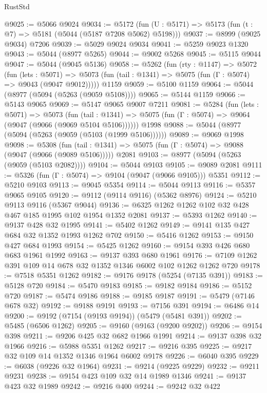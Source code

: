 \begin{lexlean}{RustStd}
\begin{coremodule}
@9025 := @5066 @9024
@9034 := @5172 (fun (U : @5171) => @5173 (fun (t : @7) => @5181 (@5044 (@5187 @7208 @5062) @5198)))
@9037 := @8999 (@9025 @9034) @7206
@9039 := @5029 @9024 @9034
@9041 := @5259 @9023 @1320
@9043 := @5044 (@8977 @5265)
@9044 := @9002 @5268
@9045 := @5115 @9044
@9047 := @5044 (@9045 @5136)
@9058 := @5262
    (fun (rty : @1147) =>
    @5072
      (fun (lets : @5071) =>
      @5073 (fun (tail : @1341) => @5075 (fun (Γ : @5074) => @9043 (@9047 @9012)))))
    @1159
@9059 := @5100 @1159
@9064 := @5044 (@8977 (@5094 (@5263 (@9059 @5108))))
@9065 := @5144 @1159
@9066 := @5143 @9065
@9069 := @5147 @9065 @9007 @7211
@9081 := @5284
    (fun (lets : @5071) =>
    @5073
      (fun (tail : @1341) => @5075 (fun (Γ : @5074) => @9064 (@9047 (@9066 (@9069 @5104 @5106))))))
    @1998
@9088 := @5044 (@8977 (@5094 (@5263 (@9059 (@5103 (@1999 @5106))))))
@9089 := @9069 @1998
@9098 := @5308
    (fun (tail : @1341) => @5075 (fun (Γ : @5074) => @9088 (@9047 (@9066 (@9089 @5106)))))
    @2081
@9103 := @8977 (@5094 (@5263 (@9059 (@5103 @2082))))
@9104 := @5044 @9103
@9105 := @9089 @2081
@9111 := @5326 (fun (Γ : @5074) => @9104 (@9047 (@9066 @9105))) @5351
@9112 := @5210 @9103
@9113 := @9045 @5354
@9114 := @5044 @9113
@9116 := @5357 @9065 @9105
@9120 := @9112 (@9114 @9116) (@5362 @8976)
@9124 := @5210 @9113 @9116 (@5367 @9044)
@9136 := @6325 @1262 @1262 @102 @32 @428 @467 @185 @1995 @102 @1954 @1352 @2081
@9137 := @5393 @1262
@9140 := @9137 @428 @32 @1995
@9141 := @5402 @1262
@9149 := @9141 @135 @427 @684 @32 @1352 @1993 @1262 @702
@9150 := @5416 @1262
@9153 := @9150 @427 @684 @1993
@9154 := @5425 @1262
@9160 := @9154 @393 @426 @680 @683 @1961 @1992
@9163 := @9137 @393 @680 @1961
@9176 := @7109 @1262 @391 @109 @14 @678 @32 @1352 @1346 @6002 @102 @1262 @1262 @720
@9178 := @7518 @5351 @1262
@9182 := @9176 @9178 (@5254 (@7135 @391))
@9183 := @5128 @720
@9184 := @5470 @9183
@9185 := @9182 @9184
@9186 := @5152 @720
@9187 := @5474 @9186
@9188 := @9185 @9187
@9191 := @5479 (@7146 @678 @32)
@9192 := @9188 @9191
@9193 := @7156 @391
@9194 := @6486 @14
@9200 := @9192 (@7154 (@9193 @9194)) (@5479 (@5481 @391))
@9202 := @5485 (@6506 @1262)
@9205 := @9160 (@9163 (@9200 @9202))
@9206 := @9154 @398
@9211 := @9206 @425 @32 @682 @1966 @1991
@9214 := @9137 @398 @32 @1966
@9216 := @5988 @5351 @1262
@9217 := @9216 @395
@9225 := @9217 @32 @109 @14 @1352 @1346 @1964 @6002 @9178
@9226 := @6040 @395
@9229 := @6038 (@9226 @32 @1964)
@9231 := @9214 (@9225 @9229)
@9232 := @9211 @9231
@9238 := @9154 @423 @109 @32 @14 @1989 @1346
@9241 := @9137 @423 @32 @1989
@9242 := @9216 @400
@9244 := @9242 @32 @422

\end{coremodule}
\end{lexlean}
